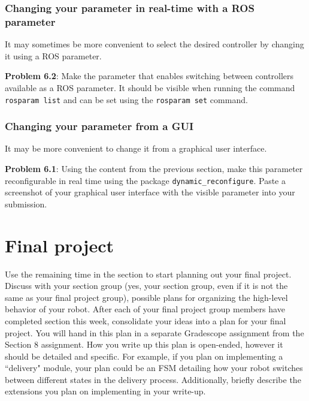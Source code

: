 \documentclass{article}
\begin{document}
\subsubsection{Changing your parameter in real-time with a ROS parameter}
It may sometimes be more convenient to select the desired controller by changing it using a ROS parameter.

\textbf{Problem 6.2}: Make the parameter that enables switching between controllers available as a ROS parameter. It should be visible when running the command \texttt{rosparam list} and can be set using the \texttt{rosparam set} command.

\subsubsection{Changing your parameter from a GUI}
It may be more convenient to change it from a graphical user interface. 

\textbf{Problem 6.1}: Using the content from the previous section, make this parameter reconfigurable in real time using the package 
\texttt{dynamic\_reconfigure}. Paste a screenshot of your graphical user interface with the visible parameter into your submission.

\section{Final project}
Use the remaining time in the section to start planning out your final project. Discuss with your section group (yes, your section group, even if it is not the same as your final project group), possible plans for organizing the high-level behavior of your robot. 
After each of your final project group members have completed section this week, consolidate your ideas into a plan for your final project. You will hand in this plan in a separate Gradescope assignment from the Section 8 assignment. 
How you write up this plan is open-ended, however it should be detailed and specific. For example, if you plan on implementing a ``delivery" module, your plan could be an FSM detailing how your robot switches between different states in the delivery process.
Additionally, briefly describe the extensions you plan on implementing in your write-up.
\end{document}

